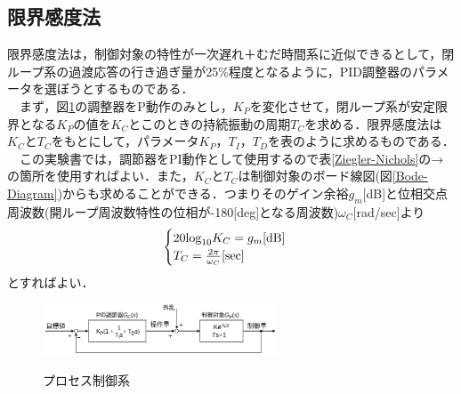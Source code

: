 \documentclass[12pt]{jsarticle}
\begin{document}
\subsection{限界感度法}
限界感度法は，制御対象の特性が一次遅れ＋むだ時間系に近似できるとして，閉ループ系の過渡応答の行き過ぎ量が25\%程度となるように，PID調整器のパラメータを選ぼうとするものである．\\
　まず，図\ref{processController}の調整器をP動作のみとし，$K_P$を変化させて，閉ループ系が安定限界となる$K_P$の値を$K_C$とこのときの持続振動の周期$T_C$を求める．限界感度法は$K_C$と$T_C$をもとにして，パラメータ$K_P$，$T_I$，$T_D$を表のように求めるものである．\\
　この実験書では，調節器をPI動作として使用するので表\ref{Ziegler-Nichols}の→の箇所を使用すればよい．また，$K_C$と$T_C$は制御対象のボード線図(図\ref{Bode-Diagram})からも求めることができる．つまりそのゲイン余裕$g_m$[dB]と位相交点周波数(開ループ周波数特性の位相が-180[deg]となる周波数)$\omega_C$[rad/sec]より
\begin{eqnarray}
  \begin{cases}
    20{\rm log}_{10}K_C = g_m  [\rm dB] & \\
    T_C = \frac{2\pi}{\omega_C} [\rm sec] &
  \end{cases}
\end{eqnarray}
とすればよい．
\begin{table}[tb]
  \begin{center}
    \label{Ziegler-Nichols}
    \caption{Ziegler-Nicholsの限界感度法}
  \end{center}
\end{table}
\begin{figure}[tb]
  \begin{center}
    \label{processController}
    \includegraphics[clip,width=7.0cm]{../img/2-A3.png}
    \caption{プロセス制御系}
  \end{center}
\end{figure}
\end{document}
